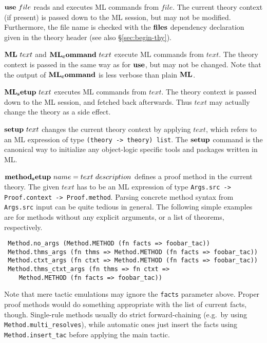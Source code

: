 \begin{descr}
\item [${\mathord{\mathbf{use}}}~file$] reads and executes ML commands from $file$.
  The current theory context (if present) is passed down to the ML session,
  but may not be modified.  Furthermore, the file name is checked with the
  ${\mathord{\mathbf{files}}}$ dependency declaration given in the theory header (see
  also \S\ref{sec:begin-thy}).
  
\item [${\mathord{\mathbf{ML}}}~text$ and ${\mathord{\mathbf{ML_command}}}~text$] execute ML
  commands from $text$.  The theory context is passed in the same way as for
  ${\mathord{\mathbf{use}}}$, but may not be changed.  Note that the output of
  ${\mathord{\mathbf{ML_command}}}$ is less verbose than plain ${\mathord{\mathbf{ML}}}$.
  
\item [${\mathord{\mathbf{ML_setup}}}~text$] executes ML commands from $text$.  The
  theory context is passed down to the ML session, and fetched back
  afterwards.  Thus $text$ may actually change the theory as a side effect.
  
\item [${\mathord{\mathbf{setup}}}~text$] changes the current theory context by
  applying $text$, which refers to an ML expression of type
  \texttt{(theory~->~theory)~list}.  The ${\mathord{\mathbf{setup}}}$ command is the
  canonical way to initialize any object-logic specific tools and packages
  written in ML.
  
\item [${\mathord{\mathbf{method_setup}}}~name = text~description$] defines a proof
  method in the current theory.  The given $text$ has to be an ML expression
  of type \texttt{Args.src -> Proof.context -> Proof.method}.  Parsing
  concrete method syntax from \texttt{Args.src} input can be quite tedious in
  general.  The following simple examples are for methods without any explicit
  arguments, or a list of theorems, respectively.

{\footnotesize
\begin{verbatim}
 Method.no_args (Method.METHOD (fn facts => foobar_tac))
 Method.thms_args (fn thms => Method.METHOD (fn facts => foobar_tac))
 Method.ctxt_args (fn ctxt => Method.METHOD (fn facts => foobar_tac))
 Method.thms_ctxt_args (fn thms => fn ctxt =>
    Method.METHOD (fn facts => foobar_tac))
\end{verbatim}
}

Note that mere tactic emulations may ignore the \texttt{facts} parameter
above.  Proper proof methods would do something appropriate with the list of
current facts, though.  Single-rule methods usually do strict forward-chaining
(e.g.\ by using \texttt{Method.multi_resolves}), while automatic ones just
insert the facts using \texttt{Method.insert_tac} before applying the main
tactic.
\end{descr}


